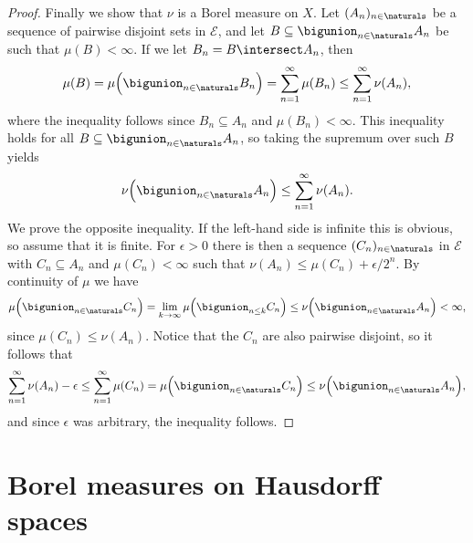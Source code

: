 \documentclass[article, a4paper, 11pt, oneside]{memoir}
\numberwithin{equation}{chapter}
\newcommand{\calE}{\mathcal{E}}
\begin{document}
\begin{proof}
    Finally we show that $\nu$ is a Borel measure on $X$. Let $(A_n)_{n \in \naturals}$ be a sequence of pairwise disjoint sets in $\calE$, and let $B \subseteq \bigunion_{n \in \naturals} A_n$ be such that $\mu(B) < \infty$. If we let $B_n = B \intersect A_n$, then
    \begin{equation*}
        \mu(B)
            = \mu \Bigl( \bigunion_{n \in \naturals} B_n \Bigr)
            = \sum_{n=1}^\infty \mu(B_n)
            \leq \sum_{n=1}^\infty \nu(A_n),
    \end{equation*}
    where the inequality follows since $B_n \subseteq A_n$ and $\mu(B_n) < \infty$. This inequality holds for all $B \subseteq \bigunion_{n \in \naturals} A_n$, so taking the supremum over such $B$ yields
    \begin{equation*}
        \nu \Bigl( \bigunion_{n \in \naturals} A_n \Bigr)
            \leq \sum_{n=1}^\infty \nu(A_n).
    \end{equation*}
    We prove the opposite inequality. If the left-hand side is infinite this is obvious, so assume that it is finite. For $\epsilon > 0$ there is then a sequence $(C_n)_{n \in \naturals}$ in $\calE$ with $C_n \subseteq A_n$ and $\mu(C_n) < \infty$ such that $\nu(A_n) \leq \mu(C_n) + \epsilon/2^n$. By continuity of $\mu$ we have
    \begin{equation*}
        \mu \Bigl( \bigunion_{n \in \naturals} C_n \Bigr)
            = \lim_{k \to \infty} \mu \Bigl( \bigunion_{n \leq k} C_n \Bigr)
            \leq \nu \Bigl( \bigunion_{n \in \naturals} A_n \Bigr)
            < \infty,
    \end{equation*}
    since $\mu(C_n) \leq \nu(A_n)$. Notice that the $C_n$ are also pairwise disjoint, so it follows that
    \begin{equation*}
        \sum_{n=1}^\infty \nu(A_n) - \epsilon
            \leq \sum_{n=1}^\infty \mu(C_n)
            = \mu \Bigl( \bigunion_{n \in \naturals} C_n \Bigr)
            \leq \nu \Bigl( \bigunion_{n \in \naturals} A_n \Bigr),
    \end{equation*}
    and since $\epsilon$ was arbitrary, the inequality follows.
\end{proof}


\section{Borel measures on Hausdorff spaces}
\end{document}
